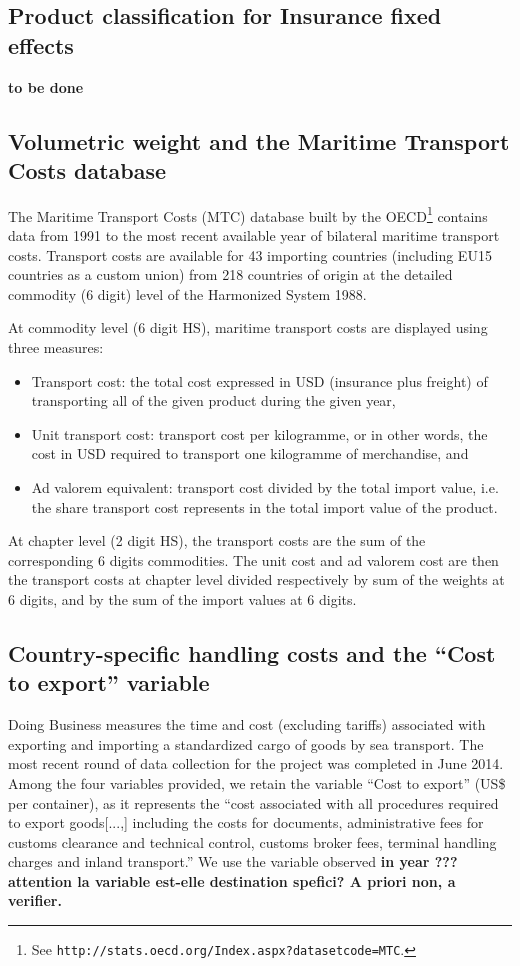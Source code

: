 \documentclass[a4paper,11pt]{article}
\begin{document}
\subsection{Product classification for Insurance fixed effects}
\textbf{to be done}

\subsection{Volumetric weight and the Maritime Transport Costs database}
The Maritime Transport Costs (MTC) database built by the OECD\footnote{See \texttt{http://stats.oecd.org/Index.aspx?datasetcode=MTC}.} contains data from 1991 to the most recent available year of bilateral maritime transport costs. Transport costs are available for 43 importing countries (including EU15 countries as a custom union) from 218 countries of origin at the detailed commodity (6 digit) level of the Harmonized System 1988.

At commodity level (6 digit HS), maritime transport costs are displayed using three measures:
\begin{itemize}
\item Transport cost: the total cost expressed in USD (insurance plus freight) of transporting all of the given product during the given year,
\item  Unit transport cost: transport cost per kilogramme, or in other words, the cost in USD required to transport one kilogramme of merchandise, and
\item Ad valorem equivalent: transport cost divided by the  total import value, i.e. the share transport cost represents in the total import value of the product.
\end{itemize}
At chapter level (2 digit HS), the transport costs are the sum of the corresponding 6 digits commodities. The unit cost and ad valorem cost are then the transport costs at chapter level divided respectively by sum of the weights at 6 digits, and by the sum of the import values at 6 digits.

\subsection{Country-specific handling costs and the ``Cost to export'' variable}


Doing Business measures the time and cost (excluding tariffs) associated with exporting and importing a standardized cargo of goods by sea transport. The most recent round of data collection for the project was completed in June 2014. Among the four variables provided, we retain the variable ``Cost to export'' (US\$ per container), as it represents the ``cost associated with all procedures required to export goods[...,] including the costs for documents, administrative fees for customs clearance and technical control, customs broker fees, terminal handling charges and inland transport.'' We use the variable observed \textbf{in year ??? attention la variable est-elle destination spefici? A priori non, a verifier.}
\end{document}
